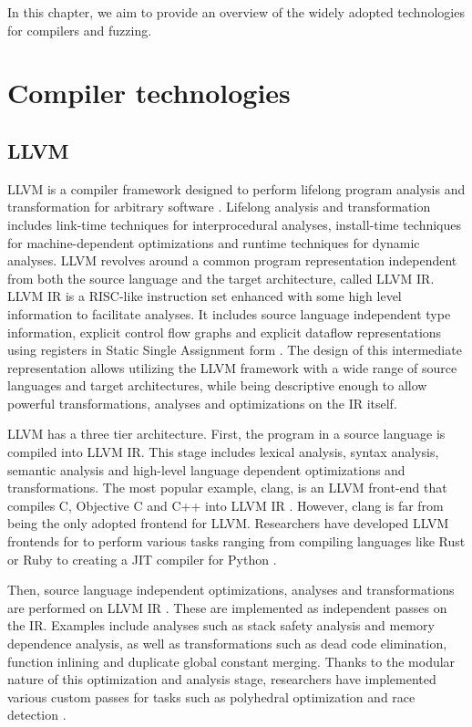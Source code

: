 In this chapter, we aim to provide an overview of the widely adopted technologies for compilers and fuzzing.

\section{Compiler technologies}
\subsection{LLVM}
LLVM is a compiler framework designed to perform lifelong program analysis and transformation for arbitrary software \cite{LLVM}.
Lifelong analysis and transformation includes link-time techniques for interprocedural analyses, install-time techniques for machine-dependent optimizations and runtime techniques for dynamic analyses.
LLVM revolves around a common program representation independent from both the source language and the target architecture, called LLVM IR.
LLVM IR is a RISC-like instruction set enhanced with some high level information to facilitate analyses.
It includes source language independent type information, explicit control flow graphs and explicit dataflow representations using registers in Static Single Assignment form \cite{SSA}.
The design of this intermediate representation allows utilizing the LLVM framework with a wide range of source languages and target architectures, while being descriptive enough to allow powerful transformations, analyses and optimizations on the IR itself.

LLVM has a three tier architecture. First, the program in a source language is compiled into LLVM IR.
This stage includes lexical analysis, syntax analysis, semantic analysis and high-level language dependent optimizations and transformations.
The most popular example, clang, is an LLVM front-end that compiles C, Objective C and C++ into LLVM IR \cite{clang}.
However, clang is far from being the only adopted frontend for LLVM.
Researchers have developed LLVM frontends for to perform various tasks ranging from compiling languages like Rust \cite{Rust} or Ruby \cite{RubyComp} to creating a JIT compiler for Python \cite{Numba}.

Then, source language independent optimizations, analyses and transformations are performed on LLVM IR \cite{LLVMIRPasses}.
These are implemented as independent passes on the IR.
Examples include analyses such as stack safety analysis and memory dependence analysis, as well as 
transformations such as dead code elimination, function inlining and duplicate global constant merging.
Thanks to the modular nature of this optimization and analysis stage, researchers have implemented various custom passes for tasks such as polyhedral optimization \cite{Polly} and race detection \cite{DynamicRaceDetection}. 

